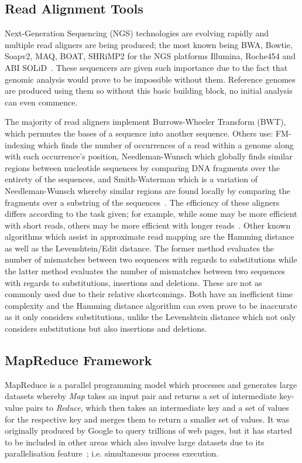 \documentclass{csfyp}
\begin{document}
\begin{small}
\subsection{Read Alignment Tools}\vspace{-4ex}
Next-Generation Sequencing (NGS) technologies are evolving rapidly and multiple read aligners are being produced; the most known being BWA, Bowtie, Soapv2, MAQ, BOAT, SHRiMP2 for the NGS platforms Illumina, Roche454 and ABI SOLiD~\cite{bwtransform, popgen, cgreads}.  These sequencers are given such importance due to the fact that genomic analysis would prove to be impossible without them.  Reference genomes are produced using them so without this basic building block, no initial analysis can even commence.     

The majority of read aligners implement Burrows-Wheeler Transform (BWT), which permutes the bases of a sequence into another sequence.  Others use: FM-indexing which finds the number of occurrences of a read within a genome along with each occurrence's position, Needleman-Wunsch which globally finds similar regions between nucleotide sequences by comparing DNA fragments over the entirety of the sequences, and Smith-Waterman which is a variation of Needleman-Wunsch whereby similar regions are found locally by comparing the fragments over a substring of the sequences~\cite{bwtransform, popgen, cgreads}.  The efficiency of these aligners differs according to the task given; for example, while some may be more efficient with short reads, others may be more efficient with longer reads~\cite{companalys, compalign}.  Other known algorithms which assist in approximate read mapping are the Hamming distance as well as the Levenshtein/Edit distance.  The former method evaluates the number of mismatches between two sequences with regards to substitutions while the latter method evaluates the number of mismatches between two sequences with regards to substitutions, insertions and deletions.  These are not as commonly used due to their relative shortcomings.  Both have an inefficient time complexity and the Hamming distance algorithm can even prove to be inaccurate as it only considers substitutions, unlike the Levenshtein distance which not only considers substitutions but also insertions and deletions.  

\subsection{MapReduce Framework}\vspace{-4ex}
MapReduce is a parallel programming model which processes and generates large datasets whereby {\textit{Map}} takes an input pair and returns a set of intermediate key-value pairs to {\textit{Reduce}}, which then takes an intermediate key and a set of values for the respective key and merges them to return a smaller set of values.  It was originally produced by Google to query trillions of web pages, but it has started to be included in other areas which also involve large datasets due to its parallelisation feature~\cite{mapreduce}; i.e. simultaneous process execution.    


\end{small}
\end{document}
